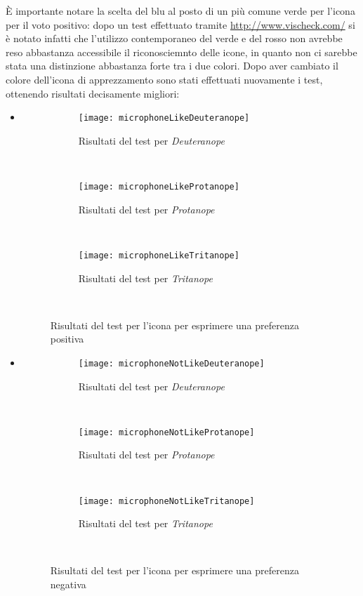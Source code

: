 \`E importante notare la scelta del blu al posto di un pi\`u comune verde per l'icona per il voto positivo: dopo un test effettuato tramite \url{http://www.vischeck.com/} si \`e notato infatti che l'utilizzo contemporaneo del verde e del rosso non avrebbe reso abbastanza accessibile il riconosciemnto delle icone, in quanto non ci sarebbe stata una distinzione abbastanza forte tra i due colori. Dopo aver cambiato il colore dell'icona di apprezzamento sono stati effettuati nuovamente i test, ottenendo risultati decisamente migliori:
\begin{itemize}

    \item[]

        \begin{figure}[H]
            \centering
            \begin{subfigure}[b]{0.3\textwidth}
                \texttt{[image: microphoneLikeDeuteranope]}
                \caption{Risultati del test per \textit{Deuteranope}}
            \end{subfigure}
        ~
            \begin{subfigure}[b]{0.3\textwidth}
                \texttt{[image: microphoneLikeProtanope]}
                \caption{Risultati del test per \textit{Protanope}}
            \end{subfigure}
        ~
            \begin{subfigure}[b]{0.3\textwidth}
                \texttt{[image: microphoneLikeTritanope]}
                \caption{Risultati del test per \textit{Tritanope}}
            \end{subfigure}
        ~
            \caption{Risultati del test per l'icona per esprimere una preferenza positiva}
        \end{figure}

    \item[]

        \begin{figure}[H]
            \centering
            \begin{subfigure}[b]{0.3\textwidth}
                \texttt{[image: microphoneNotLikeDeuteranope]}
                \caption{Risultati del test per \textit{Deuteranope}}
            \end{subfigure}
        ~
            \begin{subfigure}[b]{0.3\textwidth}
                \texttt{[image: microphoneNotLikeProtanope]}
                \caption{Risultati del test per \textit{Protanope}}
            \end{subfigure}
        ~
            \begin{subfigure}[b]{0.3\textwidth}
                \texttt{[image: microphoneNotLikeTritanope]}
                \caption{Risultati del test per \textit{Tritanope}}
            \end{subfigure}
        ~
            \caption{Risultati del test per l'icona per esprimere una preferenza negativa}
        \end{figure}

\end{itemize}

